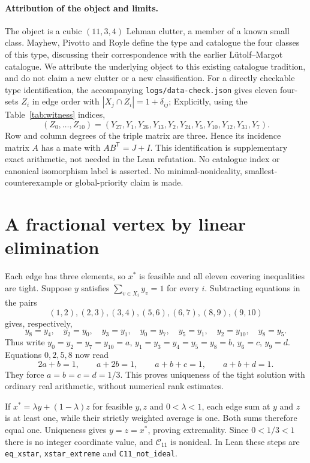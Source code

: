\documentclass[11pt]{article}
\newcommand{\C}{\mathcal C}
\begin{document}
\paragraph{Attribution of the object and limits.}
The object is a cubic $(11,3,4)$ Lehman clutter, a member of a known small class. Mayhew, Pivotto and Royle \cite[Definition 1.1, Section 5 and Table 1, pp.~25--26]{MPR} define the type and catalogue the four classes of this type, discussing their correspondence with the earlier L\"utolf--Margot catalogue. We attribute the underlying object to this existing catalogue tradition, and do not claim a new clutter or a new classification. For a directly checkable type identification, the accompanying \texttt{logs/data-check.json} gives eleven four-sets $Z_i$ in edge order with $|X_j\cap Z_i|=1+\delta_{ij}$; Explicitly, using the Table~\ref{tab:witness} indices,
\[
(Z_0,\ldots,Z_{10})=(Y_{27},Y_1,Y_{26},Y_{13},Y_2,Y_{24},Y_5,Y_{10},Y_{12},Y_{31},Y_7).
\]
Row and column degrees of the triple matrix are three. Hence its incidence matrix $A$ has a mate with $AB^{\mathsf T}=J+I$. This identification is supplementary exact arithmetic, not needed in the Lean refutation. No catalogue index or canonical isomorphism label is asserted. No minimal-nonideality, smallest-counterexample or global-priority claim is made.

\section{A fractional vertex by linear elimination}
Each edge has three elements, so $x^*$ is feasible and all eleven covering inequalities are tight. Suppose $y$ satisfies $\sum_{v\in X_i}y_v=1$ for every $i$. Subtracting equations in the pairs
\[
 (1,2),(2,3),(3,4),(5,6),(6,7),(8,9),(9,10)
\]
gives, respectively,
\[
 y_8=y_4,\quad y_2=y_0,\quad y_3=y_1,\quad
 y_0=y_7,\quad y_5=y_1,\quad y_2=y_{10},\quad y_8=y_5.
\]
Thus write $y_0=y_2=y_7=y_{10}=a$, $y_1=y_3=y_4=y_5=y_8=b$, $y_6=c$, $y_9=d$. Equations $0,2,5,8$ now read
\[
2a+b=1,\qquad a+2b=1,\qquad a+b+c=1,\qquad a+b+d=1.
\]
They force $a=b=c=d=1/3$. This proves uniqueness of the tight solution with ordinary real arithmetic, without numerical rank estimates.

If $x^*=\lambda y+(1-\lambda)z$ for feasible $y,z$ and $0<\lambda<1$, each edge sum at $y$ and $z$ is at least one, while their strictly weighted average is one. Both sums therefore equal one. Uniqueness gives $y=z=x^*$, proving extremality. Since $0<1/3<1$ there is no integer coordinate value, and $\C_{11}$ is nonideal. In Lean these steps are \texttt{eq\_xstar}, \texttt{xstar\_extreme} and \texttt{C11\_not\_ideal}.
\end{document}
